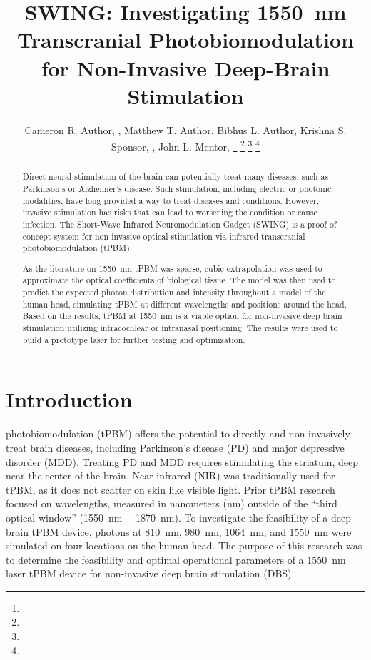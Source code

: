 \documentclass[journal,twoside,web]{ieeecolor}
\begin{document}
\title{SWING: Investigating 1550~nm Transcranial Photobiomodulation for Non-Invasive Deep-Brain Stimulation}
\author{Cameron R. Author, , Matthew T. Author, Bibhus L. Author, 
        Krishna S. Sponsor, , John L. Mentor, 
\thanks{ }
\thanks{ }
\thanks{ }
\thanks{ }}

\maketitle

\begin{abstract}
Direct neural stimulation of the brain can potentially treat many diseases, such as Parkinson's or Alzheimer's disease. Such stimulation, 
including electric or photonic modalities, have long provided a way to treat diseases and conditions. However, invasive stimulation has risks that 
can lead to worsening the condition or cause infection. The Short-Wave Infrared Neuromodulation Gadget (SWING) is a proof of concept 
system for non-invasive optical stimulation via infrared transcranial photobiomodulation (tPBM).

As the literature on 1550~nm tPBM was sparse, cubic extrapolation was used to approximate the optical coefficients of biological tissue. The model was 
then used to predict the expected photon distribution and intensity throughout a model of the human head, simulating tPBM at different wavelengths and 
positions around the head. Based on the results, tPBM at 1550~nm is a viable option for non-invasive deep brain stimulation utilizing intracochlear or 
intranasal positioning. The results were used to build a prototype laser for further testing and optimization.
\end{abstract}

\begin{IEEEkeywords}
 
\end{IEEEkeywords}

\section{Introduction}
\label{sec:introduction}
 photobiomodulation (tPBM) offers the potential to directly and non-invasively treat brain diseases, 
including Parkinson's disease (PD) and major depressive disorder (MDD). Treating PD and MDD requires stimulating the striatum, deep 
near the center of the brain. Near infrared (NIR) was traditionally used for tPBM, as it does not scatter on skin like visible light. 
Prior tPBM research focused on wavelengths, measured in nanometers (nm) outside of the “third optical window” (1550~nm~-~1870~nm). To investigate the feasibility of a deep-brain 
tPBM device, photons at 810~nm, 980~nm, 1064~nm, and 1550~nm were simulated on four locations on the human head. The purpose of this research was to 
determine the feasibility and optimal operational parameters of a 1550~nm laser tPBM device for non-invasive deep brain stimulation (DBS). 
\end{document}

